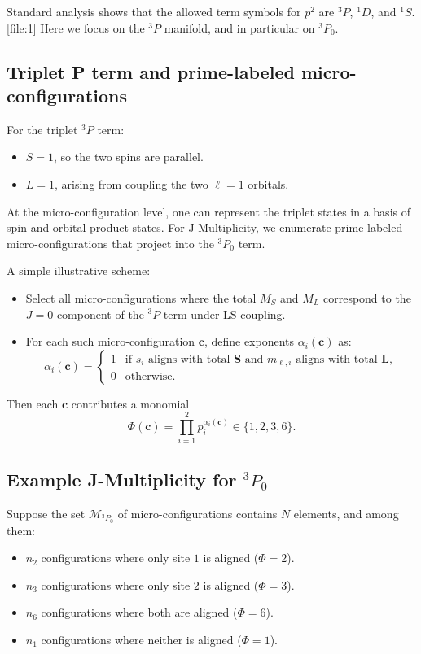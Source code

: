 \documentclass[11pt]{article}
\begin{document}
Standard analysis shows that the allowed term symbols for \(p^2\) are \(^{3}P\), \(^{1}D\), and \(^{1}S\).[file:1] Here we focus on the \(^{3}P\) manifold, and in particular on \(^{3}P_0\).

\subsection{Triplet P term and prime-labeled micro-configurations}

For the triplet \(^{3}P\) term:
\begin{itemize}
  \item \(S=1\), so the two spins are parallel.
  \item \(L=1\), arising from coupling the two \(\ell=1\) orbitals.
\end{itemize}

At the micro-configuration level, one can represent the triplet states in a basis of spin and orbital product states. For J-Multiplicity, we enumerate prime-labeled micro-configurations that project into the \(^{3}P_0\) term.

A simple illustrative scheme:
\begin{itemize}
  \item Select all micro-configurations where the total \(M_S\) and \(M_L\) correspond to the \(J=0\) component of the \(^{3}P\) term under LS coupling.
  \item For each such micro-configuration \(\mathbf{c}\), define exponents \(\alpha_i(\mathbf{c})\) as:
    \[
    \alpha_i(\mathbf{c}) = 
    \begin{cases}
      1 & \text{if } s_i \text{ aligns with total } \mathbf{S} \text{ and } m_{\ell,i} \text{ aligns with total } \mathbf{L},\\
      0 & \text{otherwise.}
    \end{cases}
    \]
\end{itemize}

Then each \(\mathbf{c}\) contributes a monomial
\[
\Phi(\mathbf{c}) = \prod_{i=1}^2 p_i^{\alpha_i(\mathbf{c})} \in \{1,2,3,6\}.
\]

\subsection{Example J-Multiplicity for \(^{3}P_0\)}

Suppose the set \(\mathcal{M}_{^{3}P_0}\) of micro-configurations contains \(N\) elements, and among them:
\begin{itemize}
  \item \(n_{2}\) configurations where only site \(1\) is aligned (\(\Phi=2\)).
  \item \(n_{3}\) configurations where only site \(2\) is aligned (\(\Phi=3\)).
  \item \(n_{6}\) configurations where both are aligned (\(\Phi=6\)).
  \item \(n_{1}\) configurations where neither is aligned (\(\Phi=1\)).
\end{itemize}
\end{document}
